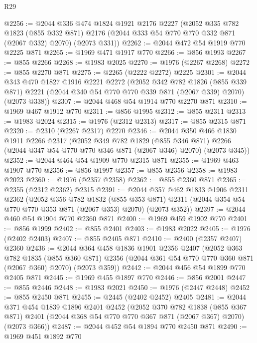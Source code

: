 \begin{lexlean}{R29}
\begin{coremodule}
@2256 := @2044
    @336
    @474
    @1824
    @1921
    @2176
    @2227
    (@2052
      @335
      @782
      @1823
      (@855 @332 @871)
      @2176
      (@2044 @333 @54 @770 @770 @332 @871 (@2067 @332) @2070)
      (@2073 @331))
@2262 := @2044 @472 @54 @1919 @770 @2225 @871
@2265 := @1969 @471 @1917 @770
@2266 := @856 @1993
@2267 := @855 @2266
@2268 := @1983 @2025
@2270 := @1976 (@2267 @2268)
@2272 := @855 @2270 @871
@2275 := @2265 (@2222 @2272) @2225
@2301 := @2044
    @343
    @470
    @1827
    @1916
    @2221
    @2272
    (@2052
      @342
      @782
      @1826
      (@855 @339 @871)
      @2221
      (@2044 @340 @54 @770 @770 @339 @871 (@2067 @339) @2070)
      (@2073 @338))
@2307 := @2044 @468 @54 @1914 @770 @2270 @871
@2310 := @1969 @467 @1912 @770
@2311 := @856 @1995
@2312 := @855 @2311
@2313 := @1983 @2024
@2315 := @1976 (@2312 @2313)
@2317 := @855 @2315 @871
@2320 := @2310 (@2267 @2317) @2270
@2346 := @2044
    @350
    @466
    @1830
    @1911
    @2266
    @2317
    (@2052
      @349
      @782
      @1829
      (@855 @346 @871)
      @2266
      (@2044 @347 @54 @770 @770 @346 @871 (@2067 @346) @2070)
      (@2073 @345))
@2352 := @2044 @464 @54 @1909 @770 @2315 @871
@2355 := @1969 @463 @1907 @770
@2356 := @856 @1997
@2357 := @855 @2356
@2358 := @1983 @2023
@2360 := @1976 (@2357 @2358)
@2362 := @855 @2360 @871
@2365 := @2355 (@2312 @2362) @2315
@2391 := @2044
    @357
    @462
    @1833
    @1906
    @2311
    @2362
    (@2052
      @356
      @782
      @1832
      (@855 @353 @871)
      @2311
      (@2044 @354 @54 @770 @770 @353 @871 (@2067 @353) @2070)
      (@2073 @352))
@2397 := @2044 @460 @54 @1904 @770 @2360 @871
@2400 := @1969 @459 @1902 @770
@2401 := @856 @1999
@2402 := @855 @2401
@2403 := @1983 @2022
@2405 := @1976 (@2402 @2403)
@2407 := @855 @2405 @871
@2410 := @2400 (@2357 @2407) @2360
@2436 := @2044
    @364
    @458
    @1836
    @1901
    @2356
    @2407
    (@2052
      @363
      @782
      @1835
      (@855 @360 @871)
      @2356
      (@2044 @361 @54 @770 @770 @360 @871 (@2067 @360) @2070)
      (@2073 @359))
@2442 := @2044 @456 @54 @1899 @770 @2405 @871
@2445 := @1969 @455 @1897 @770
@2446 := @856 @2001
@2447 := @855 @2446
@2448 := @1983 @2021
@2450 := @1976 (@2447 @2448)
@2452 := @855 @2450 @871
@2455 := @2445 (@2402 @2452) @2405
@2481 := @2044
    @371
    @454
    @1839
    @1896
    @2401
    @2452
    (@2052
      @370
      @782
      @1838
      (@855 @367 @871)
      @2401
      (@2044 @368 @54 @770 @770 @367 @871 (@2067 @367) @2070)
      (@2073 @366))
@2487 := @2044 @452 @54 @1894 @770 @2450 @871
@2490 := @1969 @451 @1892 @770

\end{coremodule}
\end{lexlean}
